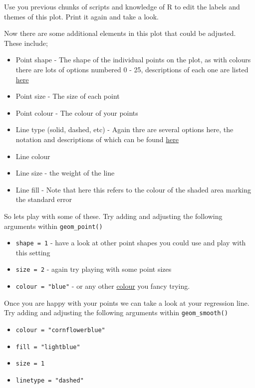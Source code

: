 \documentclass[
]{book}
\providecommand{\tightlist}{%
  \setlength{\itemsep}{0pt}\setlength{\parskip}{0pt}}
\begin{document}
Use you previous chunks of scripts and knowledge of R to edit the labels and themes of this plot. Print it again and take a look.

Now there are some additional elements in this plot that could be adjusted. These include;

\begin{itemize}
\tightlist
\item
  Point shape - The shape of the individual points on the plot, as with colours there are lots of options numbered 0 - 25, descriptions of each one are listed \href{https://www.datanovia.com/en/blog/ggplot-point-shapes-best-tips/}{here}
\item
  Point size - The size of each point
\item
  Point colour - The colour of your points
\item
  Line type (solid, dashed, etc) - Again thre are several options here, the notation and descriptions of which can be found \href{http://www.sthda.com/english/wiki/ggplot2-line-types-how-to-change-line-types-of-a-graph-in-r-software}{here}
\item
  Line colour
\item
  Line size - the weight of the line
\item
  Line fill - Note that here this refers to the colour of the shaded area marking the standard error
\end{itemize}

So lets play with some of these. Try adding and adjusting the following arguments within \texttt{geom\_point()}

\begin{itemize}
\tightlist
\item
  \texttt{shape\ =\ 1} - have a look at other point shapes you could use and play with this setting
\item
  \texttt{size\ =\ 2} - again try playing with some point sizes
\item
  \texttt{colour\ =\ "blue"} - or any other \href{https://www.datanovia.com/en/blog/awesome-list-of-657-r-color-names/}{colour} you fancy trying.
\end{itemize}

Once you are happy with your points we can take a look at your regression line. Try adding and adjusting the following arguments within \texttt{geom\_smooth()}

\begin{itemize}
\tightlist
\item
  \texttt{colour\ =\ "cornflowerblue"}
\item
  \texttt{fill\ =\ "lightblue"}
\item
  \texttt{size\ =\ 1}
\item
  \texttt{linetype\ =\ "dashed"}
\end{itemize}
\end{document}
